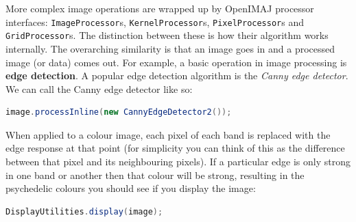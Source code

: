 More complex image operations are wrapped up by OpenIMAJ processor interfaces: \verb+ImageProcessor+s, \verb+KernelProcessor+s,
\verb+PixelProcessor+s and \verb+GridProcessor+s. The distinction between these is how their algorithm works internally. The overarching similarity is that an image goes 
in and a processed image (or data) comes out. For example, a basic operation in image processing 
is \textbf{edge detection}. A popular edge detection algorithm is the \emph{Canny edge detector}. 
We can call the Canny edge detector like so:
\begin{lstlisting}[language=java]
image.processInline(new CannyEdgeDetector2());
\end{lstlisting}
When applied to a colour image, each pixel of each band is replaced with the edge response at 
that point (for simplicity you can think of this as the difference between that pixel and its 
neighbouring pixels). If a particular edge is only strong in one band or another then that 
colour will be strong, resulting in the psychedelic colours you should see if you display 
the image:
\begin{lstlisting}[language=java]
DisplayUtilities.display(image);
\end{lstlisting}

